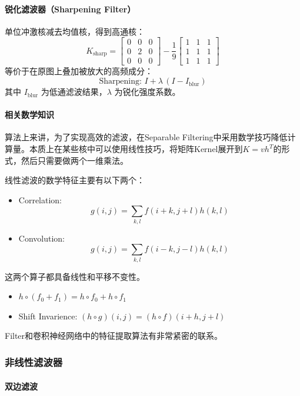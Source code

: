 \documentclass{ctexart}
\begin{document}
\paragraph{锐化滤波器（Sharpening Filter）}
单位冲激核减去均值核，得到高通核：
$$K_{\text{sharp}} = \begin{bmatrix} 0 & 0 & 0 \\ 0 & 2 & 0 \\ 0 & 0 & 0 \end{bmatrix} - \frac{1}{9}\begin{bmatrix} 1 & 1 & 1 \\ 1 & 1 & 1 \\ 1 & 1 & 1 \end{bmatrix}$$
等价于在原图上叠加被放大的高频成分：
$$\text{Sharpening: } I + \lambda\,(I - I_{\text{blur}})$$
其中 $I_{\text{blur}}$ 为低通滤波结果，$\lambda$ 为锐化强度系数。

\paragraph{相关数学知识}
算法上来讲，为了实现高效的滤波，在Separable Filtering中采用数学技巧降低计算量。本质上在某些核中可以使用线性技巧，将矩阵Kernel展开到$K = vh^{T}$的形式，然后只需要做两个一维乘法。

线性滤波的数学特征主要有以下两个：

\begin{itemize}
    \item Correlation: $$g(i,j) = \sum_{k,l}f(i+k,j+l)h(k,l)$$
    \item Convolution: $$g(i,j) = \sum_{k,l}f(i-k,j-l)h(k,l)$$
\end{itemize}

这两个算子都具备线性和平移不变性。

\begin{itemize}
    \item $h \circ (f_0+f_1) = h \circ f_0 + h \circ f_1$
    \item Shift Invarience: $(h \circ g)(i , j) = (h \circ f)(i + h , j + l) $ 
\end{itemize}

Filter和卷积神经网络中的特征提取算法有非常紧密的联系。

\subsubsection{非线性滤波器}

\paragraph{双边滤波}
\end{document}
